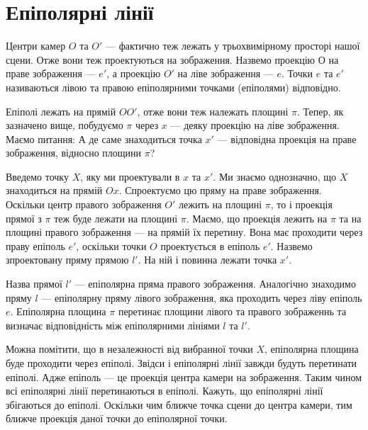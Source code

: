 \section{Епіполярні лінії}
Центри камер $O$ та $O'$ --- фактично теж лежать у трьохвимірному просторі нашої
сцени. Отже вони теж проектуються на зображення. Назвемо проекцію $О$ на праве 
зображення --- $e'$, а проекцію $O'$ на ліве зображення --- $e$. Точки $e$ та 
$e'$ називаються лівою та правою епіполярними точками (епіполями) відповідно. 

Епіполі лежать на прямій $OO'$, отже вони теж належать площині $\pi$. Тепер, 
як зазначено вище, побудуємо $\pi$ через $x$ --- деяку проекцію на ліве 
зображення. Маємо питання: А де саме знаходиться точка $x'$ --- відповідна
проекція на праве зображення, відносно площини $\pi$?

Введемо точку $X$, яку ми проектували в $x$ та $x'$. Ми знаємо однозначно, що 
$X$ знаходиться на прямій $Ox$. Спроектуємо цю пряму на праве зображення. 
Оскільки центр правого зображення $O'$ лежить на площині $\pi$, то і проекція
прямої з $\pi$ теж буде лежати на площині $\pi$. Маємо, що проекція лежить на 
$\pi$ та на площині правого зображення --- на прямій їх перетину. 
Вона має проходити через праву епіполь $e'$, оскільки точки $O$ проектується в
епіполь $e'$. Назвемо зпроектовану пряму прямою $l'$. На ній і повинна лежати 
точка $x'$. 

Назва прямої $l'$ --- епіполярна пряма правого зображення. Аналогічно знаходимо 
пряму $l$ --- епіполярну пряму лівого зображення, яка проходить через ліву 
епіполь $e$. Епіполярна площина $\pi$ перетинає площини лівого та правого 
зображеннь та визначає відповідність між епіполярними лініями $l$ та $l'$.

Можна помітити, що в незалежності від вибранної точки $X$, епіполярна площина 
буде проходити через епіполі. Звідси і епіполярні лінії завжди будуть перетинати 
епіполі. Адже епіполь --- це проекція центра камери на зображення. Таким чином 
всі епіполярні лінії перетинаються в епіполі. Кажуть, що епіполярні лінії
збігаються до епіполі. Оскільки чим ближче точка сцени до центра камери, тим 
ближче проекція даної точки до епіполярної точки.



